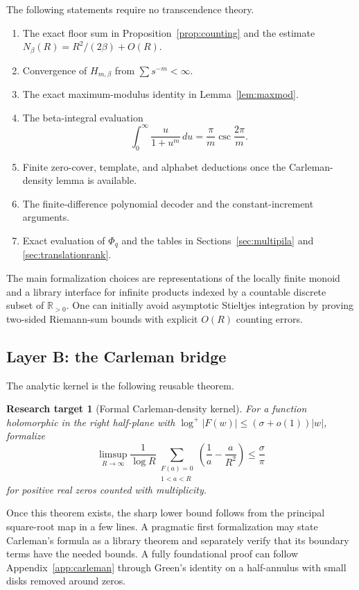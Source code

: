 \documentclass[11pt,oneside]{article}
\newtheorem{target}[theorem]{Research target}
\theoremstyle{definition}
\theoremstyle{remark}
\newcommand{\R}{\mathbb R}
\begin{document}
The following statements require no transcendence theory.

\begin{enumerate}
\item The exact floor sum in Proposition~\ref{prop:counting} and the estimate
$N_\beta(R)=R^2/(2\beta)+O(R)$.
\item Convergence of $H_{m,\beta}$ from $\sum s^{-m}<\infty$.
\item The exact maximum-modulus identity in Lemma~\ref{lem:maxmod}.
\item The beta-integral evaluation
\[
 \int_0^\infty\frac{u}{1+u^m}\,du
 =\frac\pi m\csc\frac{2\pi}{m}.
\]
\item Finite zero-cover, template, and alphabet deductions once the Carleman-density lemma is
available.
\item The finite-difference polynomial decoder and the constant-increment arguments.
\item Exact evaluation of $\Phi_q$ and the tables in Sections~\ref{sec:multipila} and
\ref{sec:translationrank}.
\end{enumerate}

The main formalization choices are representations of the locally finite monoid and a
library interface for infinite products indexed by a countable discrete subset of
$\R_{>0}$.  One can initially avoid asymptotic Stieltjes integration by proving two-sided
Riemann-sum bounds with explicit $O(R)$ counting errors.

\subsection{Layer B: the Carleman bridge}

The analytic kernel is the following reusable theorem.

\begin{target}[Formal Carleman-density kernel]
For a function holomorphic in the right half-plane with
$\log^+|F(w)|\le(\sigma+o(1))|w|$, formalize
\[
 \limsup_{R\to\infty}\frac1{\log R}
 \sum_{\substack{F(a)=0\\1<a<R}}
 \left(\frac1a-\frac a{R^2}\right)
 \le\frac\sigma\pi
\]
for positive real zeros counted with multiplicity.
\end{target}

Once this theorem exists, the sharp lower bound follows from the principal square-root map
in a few lines.  A pragmatic first formalization may state Carleman's formula as a library
theorem and separately verify that its boundary terms have the needed bounds.  A fully
foundational proof can follow Appendix~\ref{app:carleman} through Green's identity on a
half-annulus with small disks removed around zeros.
\end{document}
